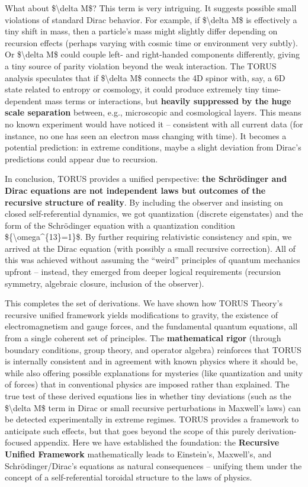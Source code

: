 What about \$\textbackslash{}delta M\$? This term is very intriguing. It
suggests possible small violations of standard Dirac behavior. For
example, if \$\textbackslash{}delta M\$ is effectively a tiny shift in
mass, then a particle's mass might slightly differ depending on
recursion effects (perhaps varying with cosmic time or environment very
subtly). Or \$\textbackslash{}delta M\$ could couple left- and
right-handed components differently, giving a tiny source of parity
violation beyond the weak interaction. The TORUS analysis speculates
that if \$\textbackslash{}delta M\$ connects the 4D spinor with, say, a
6D state related to entropy or cosmology, it could produce extremely
tiny time-dependent mass terms or interactions, but \textbf{heavily
suppressed by the huge scale separation} between, e.g., microscopic and
cosmological layers​. This means no known experiment would have noticed
it -- consistent with all current data (for instance, no one has seen an
electron mass changing with time). It becomes a potential prediction: in
extreme conditions, maybe a slight deviation from Dirac's predictions
could appear due to recursion.

In conclusion, TORUS provides a unified perspective: \textbf{the
Schrödinger and Dirac equations are not independent laws but outcomes of
the recursive structure of reality}. By including the observer and
insisting on closed self-referential dynamics, we got quantization
(discrete eigenstates) and the form of the Schrödinger equation with a
quantization condition \$\{\textbackslash{}omega\^{}\{13\}=1\}\$​. By
further requiring relativistic consistency and spin, we arrived at the
Dirac equation (with possibly a small recursive correction)​. All of
this was achieved without assuming the ``weird'' principles of quantum
mechanics upfront -- instead, they emerged from deeper logical
requirements (recursion symmetry, algebraic closure, inclusion of the
observer).

This completes the set of derivations. We have shown how TORUS Theory's
recursive unified framework yields modifications to gravity, the
existence of electromagnetism and gauge forces, and the fundamental
quantum equations, all from a single coherent set of principles. The
\textbf{mathematical rigor} (through boundary conditions, group theory,
and operator algebra) reinforces that TORUS is internally consistent and
in agreement with known physics where it should be, while also offering
possible explanations for mysteries (like quantization and unity of
forces) that in conventional physics are imposed rather than explained.
The true test of these derived equations lies in whether tiny deviations
(such as the \$\textbackslash{}delta M\$ term in Dirac or small
recursive perturbations in Maxwell's laws) can be detected
experimentally in extreme regimes. TORUS provides a framework to
anticipate such effects​, but that goes beyond the scope of this purely
derivation-focused appendix. Here we have established the foundation:
the \textbf{Recursive Unified Framework} mathematically leads to
Einstein's, Maxwell's, and Schrödinger/Dirac's equations as natural
consequences -- unifying them under the concept of a self-referential
toroidal structure to the laws of physics.

